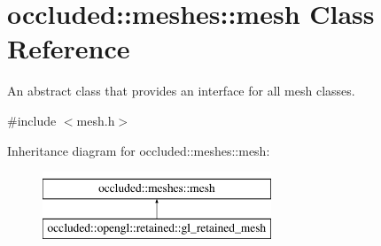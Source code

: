 \hypertarget{classoccluded_1_1meshes_1_1mesh}{\section{occluded\+:\+:meshes\+:\+:mesh Class Reference}
\label{classoccluded_1_1meshes_1_1mesh}
}


An abstract class that provides an interface for all mesh classes.  




{\ttfamily \#include $<$mesh.\+h$>$}

Inheritance diagram for occluded\+:\+:meshes\+:\+:mesh\+:\begin{figure}[H]
\begin{center}
\leavevmode
\includegraphics[height=2.000000cm]{classoccluded_1_1meshes_1_1mesh}
\end{center}
\end{figure}
